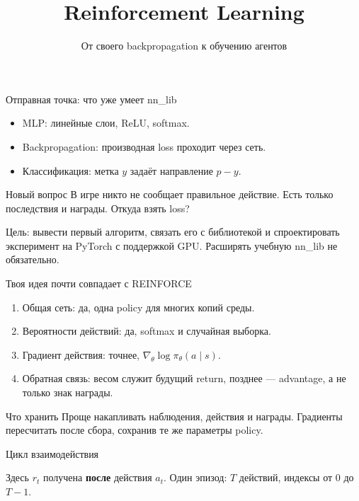 \documentclass[aspectratio=169]{beamer}
\title{Reinforcement Learning}
\subtitle{От своего backpropagation к обучению агентов}
\author{}
\date{}
\begin{document}
\begin{frame}[plain]
  \titlepage
\end{frame}

\begin{frame}{Отправная точка: что уже умеет nn\_lib}
  \begin{itemize}
    \item MLP: линейные слои, ReLU, softmax.
    \item Backpropagation: производная loss проходит через сеть.
    \item Классификация: метка $y$ задаёт направление $p-y$.
  \end{itemize}
  \begin{block}{Новый вопрос}
    В игре никто не сообщает правильное действие.
    Есть только последствия и награды. Откуда взять loss?
  \end{block}
  Цель: вывести первый алгоритм, связать его с библиотекой
  и спроектировать эксперимент на PyTorch с поддержкой GPU.
  Расширять учебную nn\_lib не обязательно.
\end{frame}

\begin{frame}{Твоя идея почти совпадает с REINFORCE}
  \begin{enumerate}
    \item Общая сеть: да, одна policy для многих копий среды.
    \item Вероятности действий: да, softmax и случайная выборка.
    \item Градиент действия: точнее, $\nabla_\theta\log\pi_\theta(a\mid s)$.
    \item Обратная связь: весом служит будущий return,
      позднее --- advantage, а не только знак награды.
  \end{enumerate}
  \begin{block}{Что хранить}
    Проще накапливать наблюдения, действия и награды.
    Градиенты пересчитать после сбора, сохранив те же параметры policy.
  \end{block}
\end{frame}

\begin{frame}{Цикл взаимодействия}
  \centering
  \vspace{0.6cm}

  Здесь $r_t$ получена \textbf{после} действия $a_t$.
  Один эпизод: $T$ действий, индексы от $0$ до $T-1$.
\end{frame}
\end{document}
